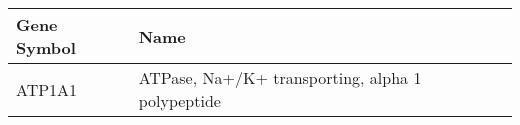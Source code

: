 \begin{tabular}{ll}
\toprule
Gene Symbol &                                             Name \\
\midrule
     ATP1A1 & ATPase, Na+/K+ transporting, alpha 1 polypeptide \\
\bottomrule
\end{tabular}

